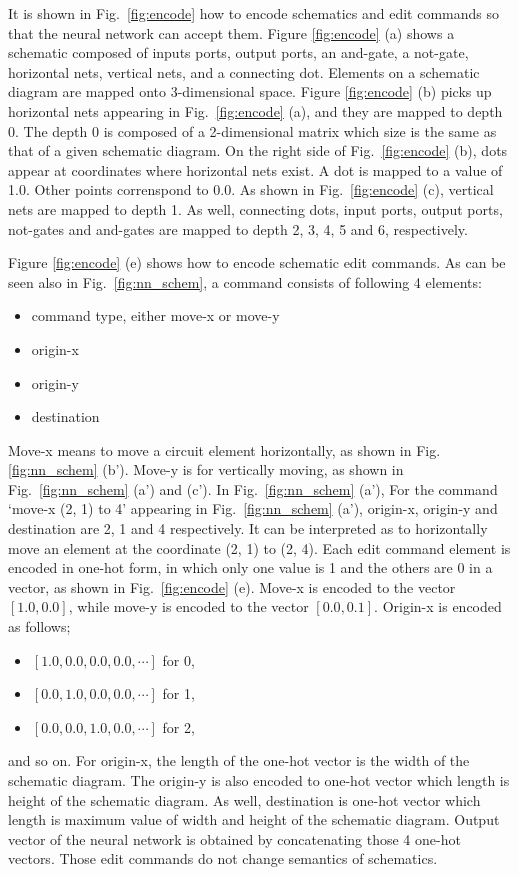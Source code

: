 \documentclass[twocolumn]{article}
\begin{document}
It is shown in Fig.\ \ref{fig:encode} how to encode
schematics and edit commands so that the neural network can accept them.
Figure \ref{fig:encode} (a) shows a schematic composed of
inputs ports, output ports, an and-gate, a not-gate,
horizontal nets, vertical nets, and a connecting dot.
Elements on a schematic diagram are
mapped onto 3-dimensional space.
Figure \ref{fig:encode} (b) picks up horizontal nets appearing
in Fig.\ \ref{fig:encode} (a), and they are mapped to depth 0.
The depth 0 is composed of a 2-dimensional matrix which size is the same
as that of a given schematic diagram.
On the right side of Fig.\ \ref{fig:encode} (b),
dots appear at coordinates where horizontal nets exist.
A dot is mapped to a value of 1.0.
Other points correnspond to 0.0.
As shown in Fig.\ \ref{fig:encode} (c),
vertical nets are mapped to depth 1.
As well, connecting dots, input ports, output ports, not-gates and and-gates
are mapped to depth 2, 3, 4, 5 and 6, respectively.

Figure \ref{fig:encode} (e) shows how to encode schematic edit commands.
As can be seen also in Fig.\ \ref{fig:nn_schem},
a command consists of following 4 elements:
\begin{itemize}
\item command type, either move-x or move-y
\item origin-x
\item origin-y
\item destination
\end{itemize}
Move-x means to move a circuit element horizontally,
as shown in Fig. \ref{fig:nn_schem} (b').
Move-y is for vertically moving, as shown in
Fig.\ \ref{fig:nn_schem} (a') and (c').
In Fig.\ \ref{fig:nn_schem} (a'), 
For the command `move-x (2, 1) to 4' appearing
in Fig.\ \ref{fig:nn_schem} (a'),
origin-x, origin-y and destination are 2, 1 and 4 respectively.
It can be interpreted as to horizontally move an element
at the coordinate (2, 1) to (2, 4).
Each edit command element is encoded in one-hot form,
in which only one value is 1 and the others are 0 in a vector,
as shown in Fig.\ \ref{fig:encode} (e).
Move-x is encoded to the vector $[1.0, 0.0]$, 
while move-y is encoded to the vector $[0.0, 0.1]$. 
Origin-x is encoded as follows;
\begin{itemize}
\item $[1.0, 0.0, 0.0, 0.0, \cdots]$ for 0,
\item $[0.0, 1.0, 0.0, 0.0, \cdots]$ for 1, 
\item $[0.0, 0.0, 1.0, 0.0, \cdots]$ for 2,
\end{itemize}
and so on.
For origin-x, the length of the one-hot vector is the width of
the schematic diagram.
The origin-y is also encoded to one-hot vector which length is
height of the schematic diagram.
As well, destination is one-hot vector which length is
maximum value of width and height of the schematic diagram.
Output vector of the neural network is obtained
by concatenating those 4 one-hot vectors.
Those edit commands do not change semantics of schematics.
\end{document}
